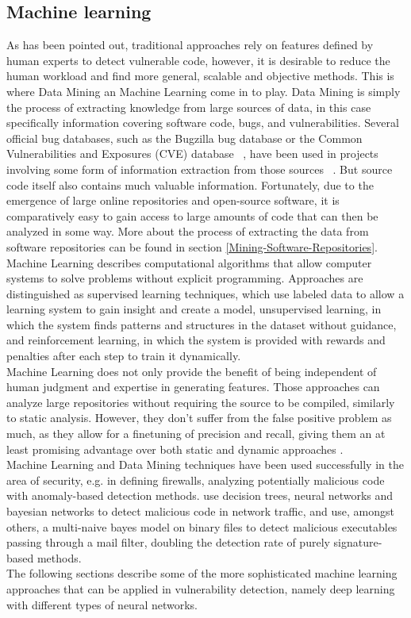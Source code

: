 \documentclass[
	a4paper,
	pagesize,
	pdftex,
	12pt,
	twoside, %
	BCOR=5mm, %
	ngerman,
	fleqn,
	final,
	]{scrartcl}
\begin{document}
\subsection{Machine learning}
As has been pointed out, traditional approaches rely on features defined by human experts to detect vulnerable code, however, it is desirable to reduce the human workload and find more general, scalable and objective methods. This is where Data Mining an Machine Learning come in to play. Data Mining is simply the process of extracting knowledge from large sources of data, in this case specifically information covering software code, bugs, and vulnerabilities. Several official bug databases, such as the Bugzilla bug database or the Common Vulnerabilities and Exposures (CVE) database ~\cite{CVE}, have been used in projects involving some form of information extraction from those sources ~\cite{Wijayasekara.2012}. But source code itself also contains much valuable information. Fortunately, due to the emergence of large online repositories and open-source software, it is comparatively easy to gain access to large amounts of code that can then be analyzed in some way. More about the process of extracting the data from software repositories can be found in section \ref{Mining-Software-Repositories}.\\
Machine Learning describes computational algorithms that allow computer systems to solve problems without explicit programming. Approaches are distinguished as supervised learning techniques, which use labeled data to allow a learning system to gain insight and create a model, unsupervised learning, in which the system finds patterns and structures in the dataset without guidance, and reinforcement learning, in which the system is provided with rewards and penalties after each step to train it dynamically.\\
Machine Learning does not only provide the benefit of being independent of human judgment and expertise in generating features. Those approaches can analyze large repositories without requiring the source to be compiled, similarly to static analysis. However, they don't suffer from the false positive problem as much, as they allow for a finetuning of precision and recall, giving them an at least promising advantage over both static and dynamic approaches \cite{Russell.2018}. \\
Machine Learning and Data Mining techniques have been used successfully in the area of security, e.g. in defining firewalls, analyzing potentially malicious code with anomaly-based detection methods. \cite{Elovici.2007} use decision trees, neural networks and bayesian networks to detect malicious code in network traffic, and \cite{Schultz.2000} use, amongst others, a multi-naive bayes model on binary files to detect malicious executables passing through a mail filter, doubling the detection rate of purely signature-based methods.\\
The following sections describe some of the more sophisticated machine learning approaches that can be applied in vulnerability detection, namely deep learning with different types of neural networks. 
\end{document}
